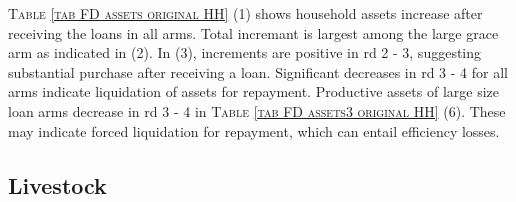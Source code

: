 \begin{palepinkleftbar}
\begin{finding}
\textsc{\small Table \ref{tab FD assets original HH}} (1) shows household assets increase after receiving the loans in all arms. Total incremant is largest among the \textsf{large grace} arm as indicated in (2). In (3), increments are positive in rd 2 - 3, suggesting substantial purchase after receiving a loan. Significant decreases in rd 3 - 4 for all arms indicate liquidation of assets for repayment. Productive assets of large size loan arms decrease in rd 3 - 4 in \textsc{\small Table \ref{tab FD assets3 original HH}} (6). These may indicate forced liquidation for repayment, which can entail efficiency losses.
\end{finding}
\end{palepinkleftbar}


\subsection{Livestock}



